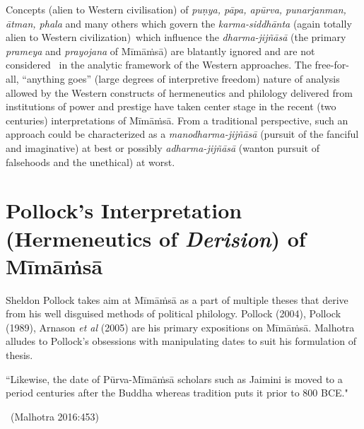 Concepts (alien to Western civilisation) of \textit{puṇya, pāpa, apūrva, punarjanman, ātman, phala} and many others which govern the \textit{karma-siddhānta} (again totally alien to Western civilization) which influence the \textit{dharma-jijñāsā} (the primary \textit{prameya} and \textit{prayojana} of Mīmāṁsā) are blatantly ignored and are not considered  in the analytic framework of the Western approaches. The free-for-all, “anything goes” (large degrees of interpretive freedom) nature of analysis allowed by the Western constructs of hermeneutics and philology delivered from institutions of power and prestige have taken center stage in the recent (two centuries) interpretations of Mīmāṁsā. From a traditional perspective, such an approach could be characterized as a \textit{manodharma-jijñāsā} (pursuit of the fanciful and imaginative) at best or possibly \textit{adharma-jijñāsā} (wanton pursuit of falsehoods and the unethical) at worst.


\section*{Pollock’s Interpretation (Hermeneutics of \textit{Derision}) of Mīmāṁsā}

Sheldon Pollock takes aim at Mīmāṁsā as a part of multiple theses that derive from his well disguised methods of political philology. Pollock (2004), Pollock (1989), Arnason \textit{et al} (2005) are his primary expositions on Mīmāṁsā. Malhotra alludes to Pollock’s obsessions with manipulating dates to suit his formulation of thesis.

\vskip 3pt

\begin{myquote}
“Likewise, the date of Pūrva-Mīmāṁsā scholars such as Jaimini is moved to a period centuries after the Buddha whereas tradition puts it prior to 800 BCE."

~\hfill (Malhotra 2016:453)
\end{myquote}

